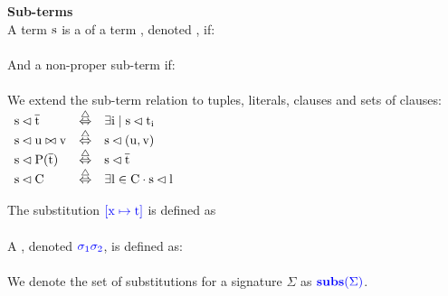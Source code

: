 \noindent
\textbf{Sub-terms}\\
A term $\mathrm{s}$ is a  of a term , denoted , if:\\
\\
And a non-proper sub-term if:\\
\\
We extend the sub-term relation to tuples, literals, clauses and sets of clauses:\\
$
\begin{array}{lll}
\m{s \lhd \tup{t}}    & \equivdef & \m{\exists i \mid s \lhd t_i}\\
\m{s \lhd u \bowtie v} & \equivdef & \m{s \lhd (u,v)}\\
\m{s \lhd \fa{P}{t}}   & \equivdef & \m{s \lhd \tup{t}}\\
\m{s \lhd C}           & \equivdef & \m{\exists l \in C \cdot s \lhd l}\\
\end{array}
$


\noindent
The substitution $\textcolor{blue}{\mathrm{[x \mapsto t]}}$ is defined as \\
\\
A , denoted {$\textcolor{blue}{\mathrm{\sigma_1\sigma_2}}$}, is defined as:\\
\\
We denote the set of substitutions for a signature $\Sigma{}$ as $\textcolor{blue}{\mathrm{\mathbf{subs}(\Sigma)}}$.


